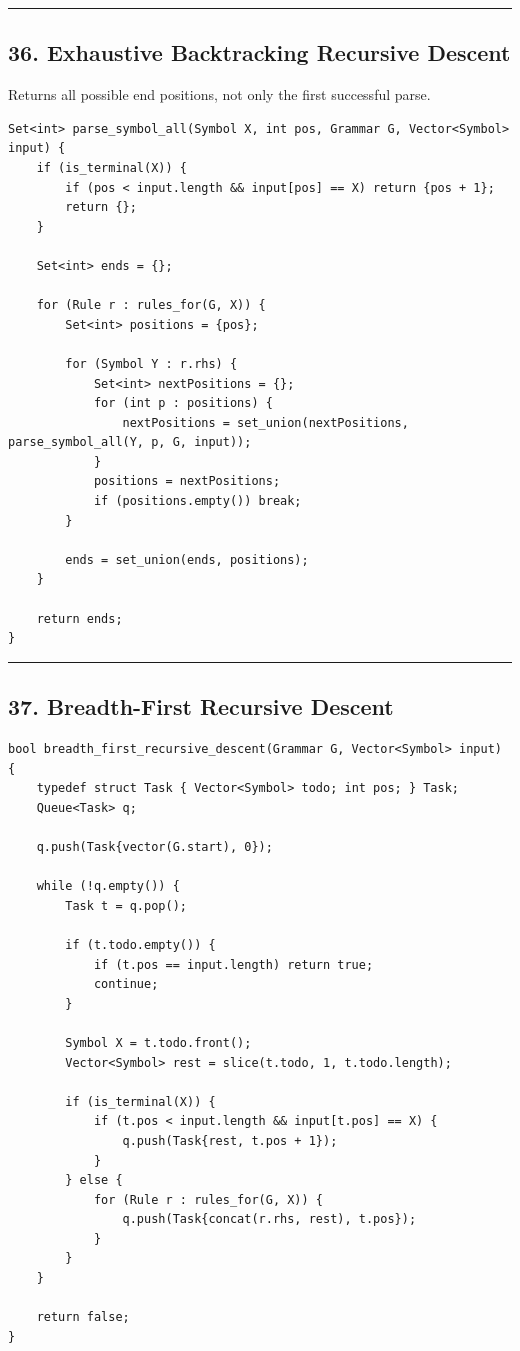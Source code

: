 \documentclass[10pt,letterpaper]{article}
\begin{document}
\medskip\hrule\medskip

\subsection*{36. Exhaustive Backtracking Recursive Descent}

Returns all possible end positions, not only the first successful parse.

\begin{verbatim}
Set<int> parse_symbol_all(Symbol X, int pos, Grammar G, Vector<Symbol> input) {
    if (is_terminal(X)) {
        if (pos < input.length && input[pos] == X) return {pos + 1};
        return {};
    }

    Set<int> ends = {};

    for (Rule r : rules_for(G, X)) {
        Set<int> positions = {pos};

        for (Symbol Y : r.rhs) {
            Set<int> nextPositions = {};
            for (int p : positions) {
                nextPositions = set_union(nextPositions, parse_symbol_all(Y, p, G, input));
            }
            positions = nextPositions;
            if (positions.empty()) break;
        }

        ends = set_union(ends, positions);
    }

    return ends;
}
\end{verbatim}

\medskip\hrule\medskip

\subsection*{37. Breadth-First Recursive Descent}

\begin{verbatim}
bool breadth_first_recursive_descent(Grammar G, Vector<Symbol> input) {
    typedef struct Task { Vector<Symbol> todo; int pos; } Task;
    Queue<Task> q;

    q.push(Task{vector(G.start), 0});

    while (!q.empty()) {
        Task t = q.pop();

        if (t.todo.empty()) {
            if (t.pos == input.length) return true;
            continue;
        }

        Symbol X = t.todo.front();
        Vector<Symbol> rest = slice(t.todo, 1, t.todo.length);

        if (is_terminal(X)) {
            if (t.pos < input.length && input[t.pos] == X) {
                q.push(Task{rest, t.pos + 1});
            }
        } else {
            for (Rule r : rules_for(G, X)) {
                q.push(Task{concat(r.rhs, rest), t.pos});
            }
        }
    }

    return false;
}
\end{verbatim}
\end{document}
